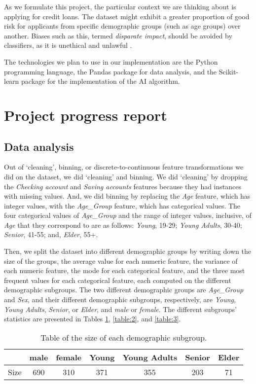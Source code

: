 \documentclass[conference]{IEEEtran}
\begin{document}
As we formulate this project, the particular context we are thinking about is applying for credit loans. The dataset might exhibit a greater proportion of good risk for applicants from specific demographic groups (such as age groups) over another. Biases such as this, termed \emph{disparate impact}, should be avoided by classifiers, as it is unethical and unlawful \cite{10.2307/24758720}.  

The technologies we plan to use in our implementation are the Python programming language, the Pandas package for data analysis, and the Scikit-learn package for the implementation of the AI algorithm.

\section{Project progress report}
\subsection{Data analysis}
Out of `cleaning', binning, or discrete-to-continuous feature transformations we did on the dataset, we did `cleaning' and binning. We did `cleaning' by dropping the \emph{Checking account} and \emph{Saving accounts} features because they had instances with missing values. And, we did binning by replacing the \emph{Age} feature, which has integer values, with the \emph{Age\_Group} feature, which has categorical values. The four categorical values of \emph{Age\_Group} and the range of integer values, inclusive, of \emph{Age} that they correspond to are as follows: \textit{Young}, 19-29; \textit{Young Adults}, 30-40; \textit{Senior}, 41-55; and, \textit{Elder}, 55+.

Then, we split the dataset into different demographic groups by writing down the size of the groups, the average value for each numeric feature, the variance of each numeric feature, the mode for each categorical feature, and the three most frequent values for each categorical feature, each computed on the different demographic subgroups. The two different demographic groups are \emph{Age\_Group} and \emph{Sex}, and their different demographic subgroups, respectively, are \textit{Young}, \textit{Young Adults}, \textit{Senior}, or \textit{Elder}, and \emph{male} or \emph{female}. The different subgroups' statistics are presented in Tables \ref{table:1}, \ref{table:2}, and \ref{table:3}.

\begin{table}[ht]
\begin{center}
\caption{Table of the size of each demographic subgroup.}
\begin{tabular}{ |c|c|c|c|c|c|c| } 
    \hline
            & male & female & Young & Young Adults & Senior & Elder \\ 
        \hline
        Size & 690  & 310    & 371   & 355          & 203    & 71    \\
        \hline
\end{tabular}
\label{table:1}
\end{center}
\end{table}
\end{document}
